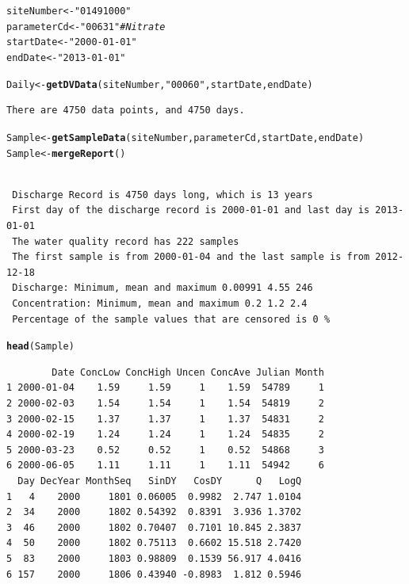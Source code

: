 \documentclass[a4paper,11pt]{article}\usepackage[]{graphicx}\usepackage[]{color}
\makeatletter
\newcommand{\hlstr}[1]{\textcolor[rgb]{0.192,0.494,0.8}{#1}}%
\newcommand{\hlcom}[1]{\textcolor[rgb]{0.678,0.584,0.686}{\textit{#1}}}%
\newcommand{\hlstd}[1]{\textcolor[rgb]{0.345,0.345,0.345}{#1}}%
\newcommand{\hlkwb}[1]{\textcolor[rgb]{0.69,0.353,0.396}{#1}}%
\newcommand{\hlkwd}[1]{\textcolor[rgb]{0.737,0.353,0.396}{\textbf{#1}}}%
\newenvironment{kframe}{%
 \def\at@end@of@kframe{}%
 \ifinner\ifhmode%
  \def\at@end@of@kframe{\end{minipage}}%
  \begin{minipage}{\columnwidth}%
 \fi\fi%
 \def\FrameCommand##1{\hskip\@totalleftmargin \hskip-\fboxsep
 \colorbox{shadecolor}{##1}\hskip-\fboxsep
     \hskip-\linewidth \hskip-\@totalleftmargin \hskip\columnwidth}%
 \MakeFramed {\advance\hsize-\width
   \@totalleftmargin\z@ \linewidth\hsize
   \@setminipage}}%
 {\par\unskip\endMakeFramed%
 \at@end@of@kframe}
\newenvironment{knitrout}{}{} %
\makeatother
\begin{document}
\begin{knitrout}
\color{fgcolor}\begin{kframe}
\begin{alltt}
\hlstd{siteNumber} \hlkwb{<-} \hlstr{"01491000"}
\hlstd{parameterCd} \hlkwb{<-} \hlstr{"00631"}  \hlcom{# Nitrate}
\hlstd{startDate} \hlkwb{<-} \hlstr{"2000-01-01"}
\hlstd{endDate} \hlkwb{<-} \hlstr{"2013-01-01"}

\hlstd{Daily} \hlkwb{<-} \hlkwd{getDVData}\hlstd{(siteNumber,} \hlstr{"00060"}\hlstd{, startDate, endDate)}
\end{alltt}
\begin{verbatim}
There are 4750 data points, and 4750 days.
\end{verbatim}
\begin{alltt}
\hlstd{Sample} \hlkwb{<-} \hlkwd{getSampleData}\hlstd{(siteNumber,parameterCd, startDate, endDate)}
\hlstd{Sample} \hlkwb{<-} \hlkwd{mergeReport}\hlstd{()}
\end{alltt}
\begin{verbatim}

 Discharge Record is 4750 days long, which is 13 years
 First day of the discharge record is 2000-01-01 and last day is 2013-01-01
 The water quality record has 222 samples
 The first sample is from 2000-01-04 and the last sample is from 2012-12-18
 Discharge: Minimum, mean and maximum 0.00991 4.55 246
 Concentration: Minimum, mean and maximum 0.2 1.2 2.4
 Percentage of the sample values that are censored is 0 %
\end{verbatim}
\begin{alltt}
\hlkwd{head}\hlstd{(Sample)}
\end{alltt}
\begin{verbatim}
        Date ConcLow ConcHigh Uncen ConcAve Julian Month
1 2000-01-04    1.59     1.59     1    1.59  54789     1
2 2000-02-03    1.54     1.54     1    1.54  54819     2
3 2000-02-15    1.37     1.37     1    1.37  54831     2
4 2000-02-19    1.24     1.24     1    1.24  54835     2
5 2000-03-23    0.52     0.52     1    0.52  54868     3
6 2000-06-05    1.11     1.11     1    1.11  54942     6
  Day DecYear MonthSeq   SinDY   CosDY      Q   LogQ
1   4    2000     1801 0.06005  0.9982  2.747 1.0104
2  34    2000     1802 0.54392  0.8391  3.936 1.3702
3  46    2000     1802 0.70407  0.7101 10.845 2.3837
4  50    2000     1802 0.75113  0.6602 15.518 2.7420
5  83    2000     1803 0.98809  0.1539 56.917 4.0416
6 157    2000     1806 0.43940 -0.8983  1.812 0.5946
\end{verbatim}
\end{kframe}
\end{knitrout}
\end{document}
